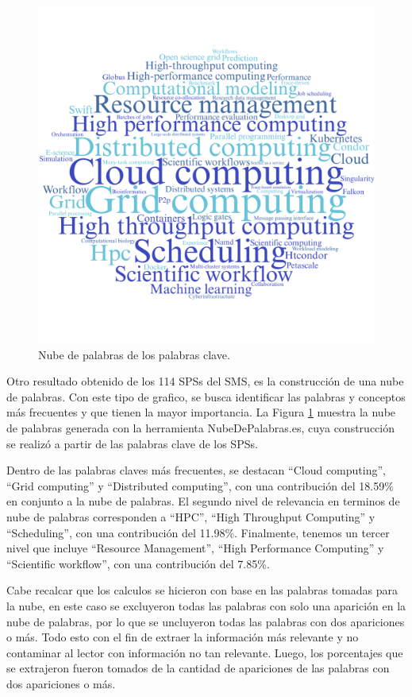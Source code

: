 \begin{figure}[htbp]
	\centering
	\vspace{10pt}
	\includegraphics[scale=0.7]{resources/figures/wordcloud.png}
	\vspace{6pt}
	\caption{Nube de palabras de los palabras clave.}
	\label{fig:WordCloud}
\end{figure}

Otro resultado obtenido de los 114 SPSs del SMS, es la construcción de una nube de palabras. Con este tipo de grafico, se busca identificar las palabras y conceptos más frecuentes y que tienen la mayor importancia. La Figura \ref{fig:WordCloud} muestra la nube de palabras generada con la herramienta NubeDePalabras.es, cuya construcción se realizó a partir de las palabras clave de los SPSs.

Dentro de las palabras claves más frecuentes, se destacan ``Cloud computing'', ``Grid computing'' y ``Distributed computing'', con una contribución del 18.59\% en conjunto a la nube de palabras. El segundo nivel de relevancia en terminos de nube de palabras corresponden a ``HPC'', ``High Throughput Computing'' y ``Scheduling'', con una contribución del 11.98\%. Finalmente, tenemos un tercer nivel que incluye ``Resource Management'', ``High Performance Computing'' y ``Scientific workflow'', con una contribución del 7.85\%.

Cabe recalcar que los calculos se hicieron con base en las palabras tomadas para la nube, en este caso se excluyeron todas las palabras con solo una aparición en la nube de palabras, por lo que se uncluyeron todas las palabras con dos apariciones o más. Todo esto con el fin de extraer la información más relevante y no contaminar al lector con información no tan relevante. Luego, los porcentajes que se extrajeron fueron tomados de la cantidad de apariciones de las palabras con dos apariciones o más.
